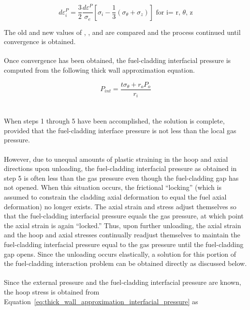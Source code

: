 \begin{equation}
    \label{eq:new_value_dep_i_prandtl_reuss_relation}
    d \varepsilon_i^P=\frac{3}{2} \frac{d \varepsilon^P}{\sigma_e} \left[ \sigma_i- \frac{1}{3} \left( \sigma_{\theta}+\sigma_z \right) \right] \text{ for i= r, }\theta \text{, z}
\end{equation}

The old and new values of \detheta, \dez , \der and are compared and the process continued until
convergence is obtained.
 \\
 \\
Once convergence has been obtained, the fuel-cladding interfacial pressure is computed from the
following thick wall approximation equation.

\begin{equation}
    \label{eq:thick_wall_approximation_interfacial_pressure}
    P_{int}=\frac{t\sigma_{\theta}+r_{o}P_{o}}{r_i}
\end{equation}
\\
\\
When steps 1 through 5 have been accomplished, the solution is complete, provided that the
fuel-cladding interface pressure is not less than the local gas pressure.
\\
\\
However, due to unequal amounts of plastic straining in the hoop and axial directions upon
unloading, the fuel-cladding interfacial pressure as obtained in step 5 is often less than the gas
pressure even though the fuel-cladding gap has not opened. When this situation occurs, the
frictional ``locking'' (which is assumed to constrain the cladding axial deformation to equal the
fuel axial deformation) no longer exists. The axial strain and stress adjust themselves so that the
fuel-cladding interfacial pressure equals the gas pressure, at which point the axial strain is again
``locked.'' Thus, upon further unloading, the axial strain and the hoop and axial stresses
continually readjust themselves to maintain the fuel-cladding interfacial pressure equal to the gas
pressure until the fuel-cladding gap opens. Since the unloading occurs elastically, a solution for
this portion of the fuel-cladding interaction problem can be obtained directly as discussed below.
\\
\\
Since the external pressure and the fuel-cladding interfacial pressure
are known, the hoop stress is obtained from Equation~\ref{eq:thick_wall_approximation_interfacial_pressure} as

